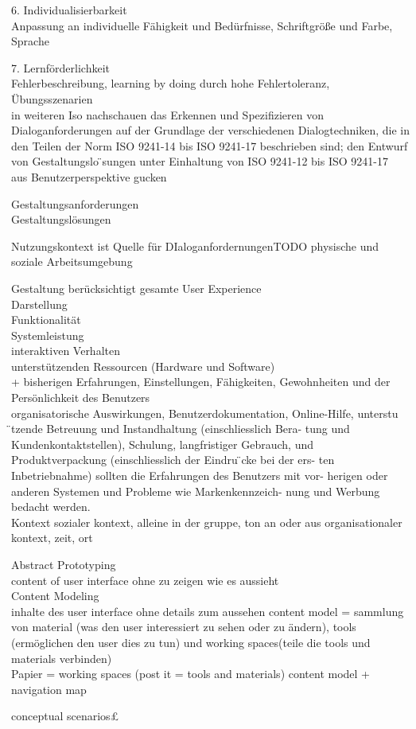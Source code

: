  6. Individualisierbarkeit\\
 	Anpassung an individuelle Fähigkeit und Bedürfnisse, Schriftgröße und Farbe, Sprache

 7. Lernförderlichkeit\\
 	Fehlerbeschreibung, learning by doing durch hohe Fehlertoleranz, Übungsszenarien\\

 	in weiteren Iso nachschauen
 	das Erkennen und Spezifizieren von Dialoganforderungen auf der Grundlage der verschiedenen Dialogtechniken, die in den Teilen der Norm ISO 9241-14 bis ISO 9241-17 beschrieben sind;
 den Entwurf von Gestaltungslo ̈sungen unter Einhaltung von ISO 9241-12 bis ISO 9241-17\\

 aus Benutzerperspektive gucken

 Gestaltungsanforderungen\\
 Gestaltungslösungen

 Nutzungskontext ist Quelle für DIaloganfordernungenTODO physische und soziale Arbeitsumgebung

 Gestaltung berücksichtigt gesamte User Experience\\
 Darstellung\\
 Funktionalität\\
 Systemleistung\\
 interaktiven Verhalten\\
 unterstützenden Ressourcen (Hardware und Software)\\
 + bisherigen Erfahrungen, Einstellungen, Fähigkeiten, Gewohnheiten und der Persönlichkeit des Benutzers\\

 organisatorische Auswirkungen, Benutzerdokumentation, Online-Hilfe, unterstu ̈tzende Betreuung und Instandhaltung (einschliesslich Bera- tung und Kundenkontaktstellen), Schulung, langfristiger Gebrauch, und Produktverpackung (einschliesslich der Eindru ̈cke bei der ers- ten Inbetriebnahme) sollten die Erfahrungen des Benutzers mit vor- herigen oder anderen Systemen und Probleme wie Markenkennzeich- nung und Werbung bedacht werden.\\

 Kontext sozialer kontext, alleine in der gruppe, ton an oder aus
 organisationaler kontext, zeit, ort

 Abstract Prototyping\\
 content of user interface ohne zu zeigen wie es aussieht\\

 Content Modeling \\
 inhalte des user interface ohne details zum aussehen
 content model = sammlung von material (was den user interessiert zu sehen oder zu ändern), tools (ermöglichen den user dies zu tun) und working spaces(teile die tools und materials verbinden)\\

 Papier = working spaces (post it = tools and materials)
 content model + navigation map

 conceptual scenarios£
